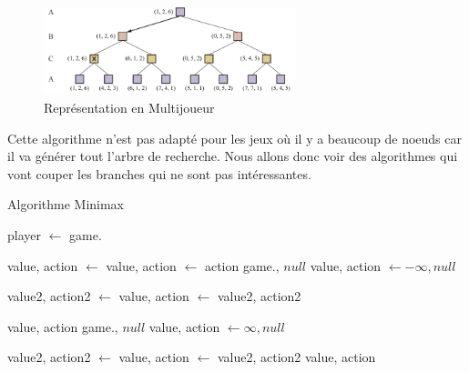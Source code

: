 \begin{figure}[H]
    \begin{center}
        \includegraphics[width=0.65\textwidth]{pictures/multiminimax.png}
    \end{center}
    \caption{Représentation en Multijoueur}\label{fig:mutliminimax}
\end{figure}

Cette algorithme n'est pas adapté pour les jeux où il y a beaucoup de noeuds car il va générer tout l'arbre de recherche. 
Nous allons donc voir des algorithmes qui vont couper les branches qui ne sont pas intéressantes.
\begin{algorithm}[H]
    \caption{Algorithme Minimax}\label{alg:minimax}
    \begin{algorithmic}
        \State player $\leftarrow$ game.
        
            \State value, action $\leftarrow$  
        \Else 
            \State value, action $\leftarrow$ 
        \EndIf
        \State \Return action
        \EndFunction
        \vspace{0.5cm}
            \State \Return game., $null$
        \EndIf 
        \State value, action $\leftarrow -\infty, null$

            \State value2, action2 $\leftarrow$ 
                \State value, action $\leftarrow$ value2, action2
            \EndIf
        \EndFor

        \Return value, action
        \EndFunction
        \vspace{0.5cm}
            \State \Return game., $null$
        \EndIf 
        \State value, action $\leftarrow \infty, null$ 

        \State value2, action2 $\leftarrow$ %
                \State value, action $\leftarrow$ value2, action2 
            \EndIf
        \EndFor
        \State \Return value, action
        \EndFunction
    \end{algorithmic} 
\end{algorithm}
\newpage

